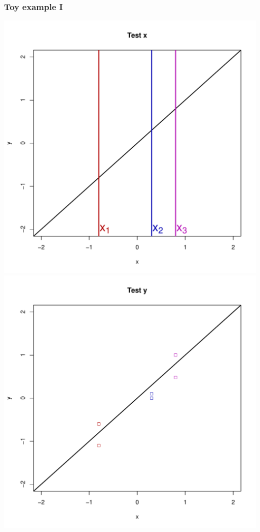 \documentclass{beamer}
\begin{document}
\begin{frame}
\frametitle{Toy example I}
\begin{center}
\includegraphics[scale = 0.2]{ti2.pdf}
\includegraphics[scale = 0.2]{ti3.pdf}

\end{center}
\end{frame}
\end{document}
